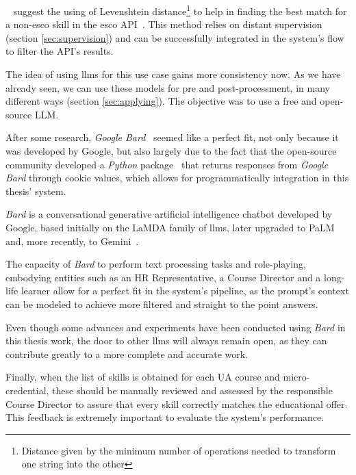 ~\citeauthor{zhang2022kompetencer} suggest the using of Levenshtein distance\footnote{Distance given by the minimum number of operations needed to transform one string into the other} to help in finding the best match for a non-\ac{esco} skill in the \ac{esco} API~\cite{zhang2022kompetencer}. This method relies on distant supervision (section \ref{sec:supervision}) and can be successfully integrated in the system’s flow to filter the API’s results. 

The idea of using \ac{llms} for this use case gains more consistency now. As we have already seen, we can use these models for pre and post-processment, in many different ways (section \ref{sec:applying}). The objective was to use a free and open-source LLM. 

After some research, \textit{Google Bard}~\cite{bard} seemed like a perfect fit, not only because it was developed by Google, but also largely due to the fact that the open-source community developed a \textit{Python} package~\cite{bard_api} that returns responses from \textit{Google Bard} through cookie values, which allows for programmatically integration in this thesis’ system.

\textit{Bard} is a conversational generative artificial intelligence chatbot developed by Google, based initially on the LaMDA family of \ac{llms}, later upgraded to PaLM and, more recently, to Gemini~\cite{bard_api}.

The capacity of \textit{Bard} to perform text processing tasks and role-playing, embodying entities such as an HR Representative, a Course Director and a long-life learner allow for a perfect fit in the system’s pipeline, as the prompt’s context can be modeled to achieve more filtered and straight to the point answers.

Even though some advances and experiments have been conducted using \textit{Bard} in this thesis work, the door to other \ac{llms} will always remain open, as they can contribute greatly to a more complete and accurate work.

Finally, when the list of skills is obtained for each UA course and micro-credential, these should be manually reviewed and assessed by the responsible Course Director to assure that every skill correctly matches the educational offer.
This feedback is extremely important to evaluate the system's performance.